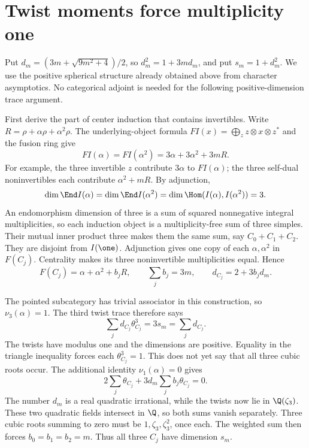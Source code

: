 \section{Twist moments force multiplicity one}

Put $d_m=(3m+\sqrt{9m^2+4})/2$, so
$d_m^2=1+3md_m$, and put $s_m=1+d_m^2$.
We use the positive spherical structure already obtained above from
character asymptotics. No categorical adjoint is needed for the
following positive-dimension trace argument.

First derive the part of center induction that contains invertibles.
Write $R=\rho+\alpha\rho+\alpha^2\rho$. The underlying-object formula
$FI(x)=\bigoplus_z z\otimes x\otimes z^*$ and the fusion ring give
\[
 FI(\alpha)=FI(\alpha^2)=3\alpha+3\alpha^2+3mR.
\]
For example, the three invertible $z$ contribute $3\alpha$ to
$FI(\alpha)$; the three self-dual noninvertibles each contribute
$\alpha^2+mR$. By adjunction,
\[
 \dim\End I(\alpha)=\dim\End I(\alpha^2)
 =\dim\Hom(I(\alpha),I(\alpha^2))=3.
\]
An endomorphism dimension of three is a sum of squared nonnegative
integral multiplicities, so each induction object is a multiplicity-free
sum of three simples. Their mutual inner product three makes them
the same sum, say $C_0+C_1+C_2$. They are disjoint from $I(\one)$.
Adjunction gives one copy of each $\alpha,\alpha^2$ in $F(C_j)$.
Centrality makes its three noninvertible multiplicities equal. Hence
\[
 F(C_j)=\alpha+\alpha^2+b_jR,\qquad
 \sum_jb_j=3m,\qquad d_{C_j}=2+3b_jd_m.
\]

The pointed subcategory has trivial associator in this construction,
so $\nu_3(\alpha)=1$. The third twist trace therefore says
\[
 \sum_j d_{C_j}\theta_{C_j}^3
   =3s_m=\sum_jd_{C_j}.
\]
The twists have modulus one and the dimensions are positive. Equality
in the triangle inequality forces each $\theta_{C_j}^3=1$.
This does not yet say that all three cubic roots occur.
The additional identity $\nu_1(\alpha)=0$ gives
\[
 2\sum_j\theta_{C_j}+3d_m\sum_jb_j\theta_{C_j}=0.
\]
The number $d_m$ is a real quadratic irrational, while the twists now
lie in $\Q(\zeta_3)$. These two quadratic fields intersect in $\Q$,
so both sums vanish separately. Three cubic roots summing to zero
must be $1,\zeta_3,\zeta_3^2$, once each. The weighted sum then
forces $b_0=b_1=b_2=m$. Thus all three $C_j$ have dimension $s_m$.

